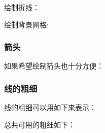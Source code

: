 \documentclass[12pt]{article}
\begin{document}
绘制折线：

\begin{Shaded}
\begin{Highlighting}[]
\end{Highlighting}
\end{Shaded}

绘制背景网格:

\begin{Shaded}
\begin{Highlighting}[]
\end{Highlighting}
\end{Shaded}

\subsubsection{箭头}\label{ux7badux5934}

如果希望绘制箭头也十分方便：

\begin{Shaded}
\begin{Highlighting}[]
\end{Highlighting}
\end{Shaded}

\subsubsection{线的粗细}\label{ux7ebfux7684ux7c97ux7ec6}

线的粗细可以用如下来表示：

\begin{Shaded}
\begin{Highlighting}[]
\end{Highlighting}
\end{Shaded}

总共可用的粗细如下：
\end{document}
